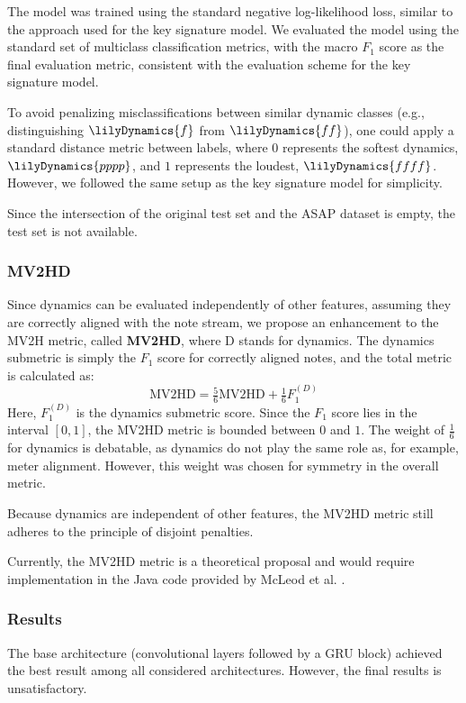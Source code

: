 The model was trained using the standard negative log-likelihood loss, similar to the approach used for the key signature model. We evaluated the model using the standard set of multiclass classification metrics, with the macro $F_1$ score as the final evaluation metric, consistent with the evaluation scheme for the key signature model.

To avoid penalizing misclassifications between similar dynamic classes (e.g., distinguishing $\lilyDynamics{f}$ from $\lilyDynamics{ff}$), one could apply a standard distance metric between labels, where $0$ represents the softest dynamics, $\lilyDynamics{pppp}$, and $1$ represents the loudest, $\lilyDynamics{ffff}$. However, we followed the same setup as the key signature model for simplicity.

Since the intersection of the original test set and the ASAP dataset is empty, the test set is not available. 

\subsubsection{MV2HD}

Since dynamics can be evaluated independently of other features, assuming they are correctly aligned with the note stream, we propose an enhancement to the MV2H metric, called \textbf{MV2HD}, where D stands for dynamics. The dynamics submetric is simply the $F_1$ score for correctly aligned notes, and the total metric is calculated as: \[\textrm{MV2HD} = \tfrac{5}{6}\textrm{MV2HD} + \tfrac{1}{6}F_1^{(D)}\] Here, $F_1^{(D)}$ is the dynamics submetric score. Since the $F_1$ score lies in the interval $[0, 1]$, the MV2HD metric is bounded between $0$ and $1$. The weight of $\tfrac{1}{6}$ for dynamics is debatable, as dynamics do not play the same role as, for example, meter alignment. However, this weight was chosen for symmetry in the overall metric.

Because dynamics are independent of other features, the MV2HD metric still adheres to the principle of disjoint penalties.

Currently, the MV2HD metric is a theoretical proposal and would require implementation in the Java code provided by McLeod et al. \cite{McLeod2019}.

\subsubsection{Results}

The base architecture (convolutional layers followed by a GRU block) achieved the best result among all considered architectures. However, the final results is unsatisfactory.

